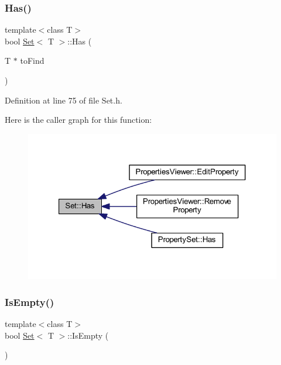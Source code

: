 \subsubsection{\texorpdfstring{Has()}{Has()}}
{\footnotesize\ttfamily template$<$class T$>$ \\
bool \hyperlink{class_set}{Set}$<$ T $>$\+::Has (\begin{DoxyParamCaption}\item[{T $\ast$}]{to\+Find }\end{DoxyParamCaption})\hspace{0.3cm}{\ttfamily [inline]}}



Definition at line 75 of file Set.\+h.

Here is the caller graph for this function\+:
\nopagebreak
\begin{figure}[H]
\begin{center}
\leavevmode
\includegraphics[width=321pt]{class_set_a48747d0c4789b12fa690fa262e5bf361_icgraph}
\end{center}
\end{figure}
\mbox{\label{class_set_ac0ef2fc243b8e89c6c77485203cde754}} 
\subsubsection{\texorpdfstring{Is\+Empty()}{IsEmpty()}}
{\footnotesize\ttfamily template$<$class T$>$ \\
bool \hyperlink{class_set}{Set}$<$ T $>$\+::Is\+Empty (\begin{DoxyParamCaption}{ }\end{DoxyParamCaption})\hspace{0.3cm}{\ttfamily [inline]}}



